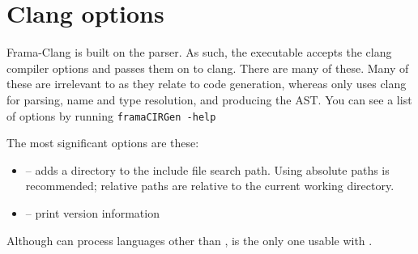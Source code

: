 \section{Clang options}

Frama-Clang is built on the \clang \cpp parser. 
As such, the \irg executable accepts the clang
compiler options and passes them on to clang. There are many of these.
Many of these are irrelevant to \fcl as they relate to 
code generation, whereas \fcl only uses clang for parsing, name
and type resolution, and producing the AST.
You can see a list of options by running 
\lstinline|framaCIRGen -help|

The most significant \cl options are these:
\begin{itemize}
	\item {} -- adds a directory to the include file search path. Using absolute paths is recommended; relative paths are relative to the current working directory.
	\item {} -- print version information
\end{itemize}

Although \clang can process languages other than \cpp, \cpp is the only one usable with \fclang.

%

